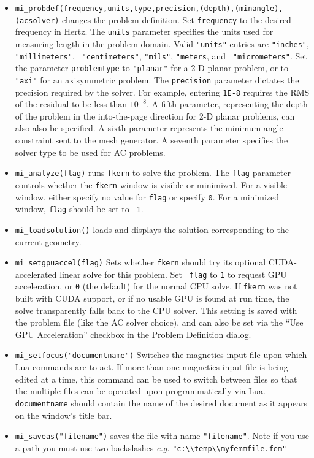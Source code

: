 \begin{itemize}
\item{\tt mi\_probdef(frequency,units,type,precision,(depth),(minangle),(acsolver)} changes the
problem definition. Set {\tt frequency} to the desired frequency in
Hertz.  The {\tt units} parameter specifies the units used for
measuring length in the problem domain.  Valid {\tt "units"}
entries are {\tt "inches"}, {\tt "millimeters"}, {\tt
"centimeters"}, {\tt "mils"}, {\tt "meters}, and {\tt
"micrometers"}. Set the parameter {\tt problemtype} to {\tt "planar"} for a 2-D
planar problem, or to {\tt "axi"} for an axisymmetric problem. The
{\tt precision} parameter dictates the precision required by the
solver.  For example, entering {\tt 1E-8} requires the RMS of the
residual to be less than $10^{-8}$.  A fifth parameter, representing the depth of
the problem in the into-the-page direction for 2-D planar problems, can also
also be specified. A sixth parameter represents the minimum angle constraint sent to the mesh generator.
A seventh parameter specifies the solver type to be used for AC problems.

\item{\tt mi\_analyze(flag)}
runs {\tt fkern} to solve the problem.  The {\tt flag} parameter
controls whether the {\tt fkern} window is visible or minimized.  For a
visible window, either specify no value for {\tt flag} or specify
{\tt 0}. For a minimized window, {\tt flag} should be set to {\tt
1}.

\item{\tt mi\_loadsolution()} loads and displays the solution corresponding to the
current geometry.

\item{\tt mi\_setgpuaccel(flag)} Sets whether {\tt fkern} should try
its optional CUDA-accelerated linear solve for this problem. Set {\tt
flag} to {\tt 1} to request GPU acceleration, or {\tt 0} (the default)
for the normal CPU solve. If {\tt fkern} was not built with CUDA
support, or if no usable GPU is found at run time, the solve
transparently falls back to the CPU solver. This setting is saved with
the problem file (like the AC solver choice), and can also be set via
the ``Use GPU Acceleration'' checkbox in the Problem Definition
dialog.

\item {\tt mi\_setfocus("documentname")} Switches the
magnetics input file upon which Lua commands are to act. If
more than one magnetics input file is being edited at a time,
this command can be used to switch between files so that the
multiple files can be operated upon programmatically via Lua. {\tt
documentname} should contain the name of the desired document as
it appears on the window's title bar.

\item{\tt mi\_saveas("filename")} saves the file with name {\tt "filename"}.
Note if you use a path you must use two backslashes {\em e.g.}
\verb+"c:\\temp\\myfemmfile.fem"+
\end{itemize}

